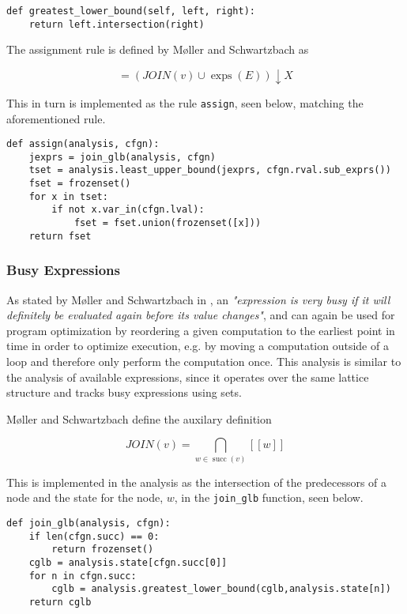 \begin{verbatim}
def greatest_lower_bound(self, left, right): 
    return left.intersection(right)
\end{verbatim}

\noindent The assignment rule is defined by Møller and Schwartzbach as

\begin{equation*}
    [v]=(J O I N(v) \cup \operatorname{exps}(E)) \downarrow X
\end{equation*}

\noindent This in turn is implemented as the rule \texttt{assign}, seen below, matching the aforementioned rule. 

\begin{verbatim}
def assign(analysis, cfgn):
    jexprs = join_glb(analysis, cfgn)
    tset = analysis.least_upper_bound(jexprs, cfgn.rval.sub_exprs())
    fset = frozenset()
    for x in tset:
        if not x.var_in(cfgn.lval):
            fset = fset.union(frozenset([x]))
    return fset
\end{verbatim}

\subsubsection{Busy Expressions}
As stated by Møller and Schwartzbach in \cite{spa}, an \textit{"expression is very busy if it will definitely be evaluated again before its value changes"}, and can again be used for program optimization by reordering a given computation to the earliest point in time in order to optimize execution, e.g. by moving a computation outside of a loop and therefore only perform the computation once. This analysis is similar to the analysis of available expressions, since it operates over the same lattice structure and tracks busy expressions using sets.

\newpar Møller and Schwartzbach define the auxilary definition

\begin{equation*}
    J O I N (v) = \mathop{\bigcap}_{w \in \operatorname{succ}(v)} [[w]]
\end{equation*}

\noindent This is implemented in the analysis as the intersection of the predecessors of a node and the state for the node, $w$, in the \texttt{join\_glb} function, seen below. 

\begin{verbatim}
def join_glb(analysis, cfgn):
    if len(cfgn.succ) == 0:
        return frozenset()
    cglb = analysis.state[cfgn.succ[0]]
    for n in cfgn.succ:
        cglb = analysis.greatest_lower_bound(cglb,analysis.state[n])
    return cglb
\end{verbatim}

